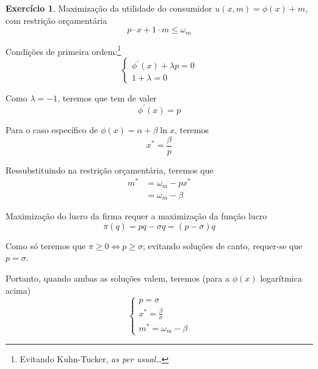 \documentclass[12pt]{article}
\numberwithin{equation}{section}
\theoremstyle{plain}
\theoremstyle{definition}
\newtheorem{exercise}{Exercício}
\theoremstyle{remark}
\begin{document}
\begin{exercise}
Maximização da utilidade do consumidor \(u(x,m) = \phi(x) + m\), com
restrição orçamentária
\[
p\cdot x+1\cdot m \leq \omega_{m}
\]

Condições de primeira ordem:\footnote{Evitando Kuhn-Tucker, \textit{as
  per usual}\ldots{}}
\[
\begin{cases}
\phi^\prime(x) + \lambda p = 0 \\
1 + \lambda = 0
\end{cases}
\]

Como \(\lambda=-1\), teremos que tem de valer
\[
\phi^\prime(x) = p
\]

Para o caso específico de \(\phi(x) = \alpha+\beta \ln x\), teremos
\[
x^* = \frac{\beta}{p}
\]

Ressubstituindo na restrição orçamentária, teremos que \begin{align*}
m^* &= \omega_{m}-p x^* \\
&= \omega_{m}- \beta
\end{align*}

Maximização do lucro da firma requer a maximização da função lucro
\[
\pi(q) = pq-\sigma q = (p-\sigma)q
\]

Como só teremos que \(\pi\geq 0 \iff p \geq \sigma\); evitando soluções
de canto, requer-se que \(p=\sigma\).

Portanto, quando ambas as soluções valem, teremos (para a \(\phi(x)\)
logarítmica acima)
\[
\begin{cases}
p=\sigma \\
x^*=\frac{\beta}{\sigma} \\
m^* = \omega_{m}-\beta
\end{cases}
\]

\end{exercise}

\printbibliography
\end{document}
